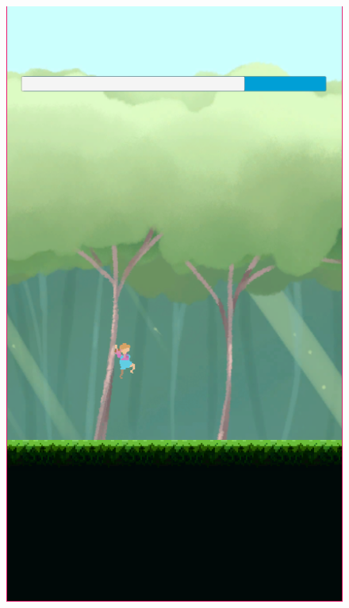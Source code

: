 \begin{figure}[h]
\begin{minipage}{.22\textwidth}
        \includegraphics[width=\textwidth]{imgs/screenshot10.png}
    \end{minipage}
    \begin{minipage}{.22\textwidth}

\end{minipage}
\end{figure}
